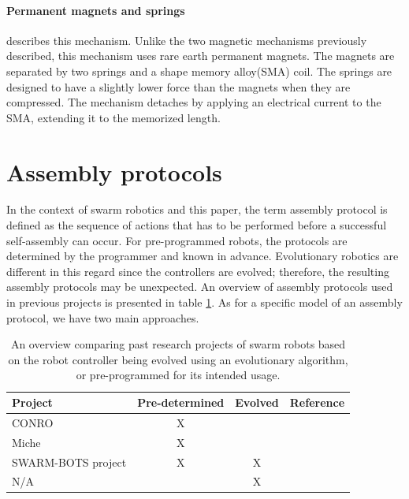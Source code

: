 \paragraph*{Permanent magnets and springs }
\cite{murata_hardware_2000} describes this mechanism.
Unlike the two magnetic mechanisms previously described, this mechanism uses rare earth permanent magnets.
The magnets are separated by two springs and a shape memory alloy(SMA) coil.
The springs are designed to have a slightly lower force than the magnets when they are compressed.
The mechanism detaches by applying an electrical current to the SMA, extending it to the memorized length.


\section{Assembly protocols}
\label{sec:protocol}
In the context of swarm robotics and this paper, the term assembly protocol is defined as the sequence of actions that has to be performed before a successful self-assembly can occur. 
For pre-programmed robots, the protocols are determined by the programmer and known in advance.
Evolutionary robotics are different in this regard since the controllers are evolved; therefore, the resulting assembly protocols may be unexpected. 
An overview of assembly protocols used in previous projects is presented in table \ref{tab:protocols}.
As for a specific model of an assembly protocol, we have two main approaches. 

\begin{table}[H]
	\centering
	\begin{tabular}{@{}  l  c  c  l @{}}
		\toprule
		Project & Pre-determined & Evolved & Reference\\ \midrule
		CONRO & X & & \cite{castano_conro:_2000}\\ 
		Miche & X & & \cite{gilpin_miche:_2008}\\ 
		SWARM-BOTS project & X & X & \cite{gross_object_2006, trianni_evolving_2004}\\ 
		N/A & & X & \cite{weel_emergence_2012}\\ \bottomrule
	\end{tabular}
	\caption{An overview comparing past research projects of swarm robots based on the robot controller being evolved using an evolutionary algorithm, or pre-programmed for its intended usage.}
	
	\label{tab:protocols}
\end{table}

